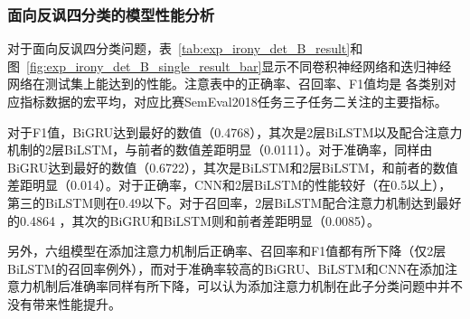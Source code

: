 \subsubsection{面向反讽四分类的模型性能分析}
\label{sssec:exp_irony_det_B_base}

对于面向反讽四分类问题，表~\ref{tab:exp_irony_det_B_result}和图~\ref{fig:exp_irony_det_B_single_result_bar}显示不同卷积神经网络和迭归神经网络在测试集上能达到的性能。注意表中的正确率、召回率、F1值均是
各类别对应指标数据的宏平均，对应比赛SemEval2018任务三子任务二关注的主要指标。

对于F1值，BiGRU达到最好的数值（0.4768），其次是2层BiLSTM以及配合注意力机制的2层BiLSTM，与前者的数值差距明显（0.0111）。对于准确率，同样由BiGRU达到最好的数值（0.6722），其次是BiLSTM和2层BiLSTM，和前者的数值差距明显（0.014）。对于正确率，CNN和2层BiLSTM的性能较好（在0.5以上），第三的BiLSTM则在0.49以下。对于召回率，2层BiLSTM配合注意力机制达到最好的0.4864 ，其次的BiGRU和BiLSTM则和前者差距明显（0.0085）。

另外，六组模型在添加注意力机制后正确率、召回率和F1值都有所下降（仅2层BiLSTM的召回率例外），而对于准确率较高的BiGRU、BiLSTM和CNN在添加注意力机制后准确率同样有所下降，可以认为添加注意力机制在此子分类问题中并不没有带来性能提升。

